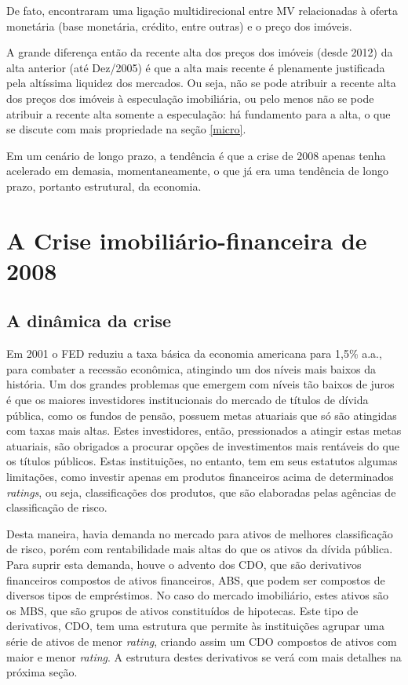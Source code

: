 \documentclass[
	12pt,				%
	oneside,			%
	a4paper,			%
	chapter=TITLE,		%
	section=TITLE,		%
	english,			%
	brazil				%
	]{abntex2}
\begin{document}
De fato, \textcite{goodhart2008} encontraram uma ligação multidirecional entre \gls{MV}
relacionadas à oferta monetária (base monetária, crédito, entre outras) e o
preço dos imóveis.

A grande diferença então da recente alta dos preços dos imóveis (desde 2012) da
alta anterior (até Dez/2005) é que a alta mais recente é plenamente justificada
pela altíssima liquidez dos mercados. Ou seja, não se pode atribuir a recente
alta dos preços dos imóveis à especulação imobiliária, ou pelo menos não se pode
atribuir a recente alta somente a especulação: há fundamento para a alta, o que
se discute com mais propriedade na seção \ref{micro}.

Em um cenário de longo prazo, a tendência é que a crise de 2008 apenas tenha
acelerado em demasia, momentaneamente, o que já era uma tendência de longo
prazo, portanto estrutural, da economia.

\hypertarget{a-crise-imobiliuxe1rio-financeira-de-2008}{%
\section{A Crise imobiliário-financeira de 2008}\label{a-crise-imobiliuxe1rio-financeira-de-2008}}

\hypertarget{a-dinuxe2mica-da-crise}{%
\subsection{A dinâmica da crise}\label{a-dinuxe2mica-da-crise}}

Em 2001 o \gls{FED} reduziu a taxa básica da economia americana para 1,5\% a.a.,
para combater a recessão econômica, atingindo um dos níveis mais baixos da
história. Um dos grandes problemas que emergem com níveis tão baixos de juros é
que os maiores investidores institucionais do mercado de títulos de dívida
pública, como os fundos de pensão, possuem metas atuariais que só são atingidas
com taxas mais altas. Estes investidores, então, pressionados a atingir estas
metas atuariais, são obrigados a procurar opções de investimentos mais rentáveis
do que os títulos públicos. Estas instituições, no entanto, tem em seus
estatutos algumas limitações, como investir apenas em produtos financeiros acima
de determinados \emph{ratings}, ou seja, classificações dos produtos, que são
elaboradas pelas agências de classificação de risco.

Desta maneira, havia demanda no mercado para ativos de melhores classificação de
risco, porém com rentabilidade mais altas do que os ativos da dívida pública.
Para suprir esta demanda, houve o advento dos \gls{CDO}, que são derivativos
financeiros compostos de ativos financeiros, \gls{ABS}, que podem ser compostos
de diversos tipos de empréstimos. No caso do mercado imobiliário, estes ativos
são os \gls{MBS}, que são grupos de ativos constituídos de hipotecas. Este tipo
de derivativos, \gls{CDO}, tem uma estrutura que permite às instituições agrupar
uma série de ativos de menor \emph{rating}, criando assim um \gls{CDO} compostos de
ativos com maior e menor \emph{rating}. A estrutura destes derivativos se verá com
mais detalhes na próxima seção.
\end{document}
